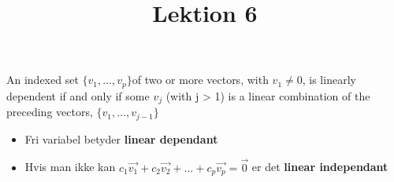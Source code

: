 \documentclass[danish, english]{article}
\title{Lektion 6}
\begin{document}
\maketitle

\begin{theo}[Theorem 4] 
An indexed set $\{v_1, \dots, v_p\} $of two or more vectors, with $v_1 \neq 0$, is linearly dependent if and only if some $v_j$ (with j > 1) is a linear combination of the preceding vectors, $\{v_1, \dots, v_{j-1}\} $
\end{theo}

\begin{theo} 
\begin{itemize}
\item Fri variabel betyder \textbf{linear dependant}
\item Hvis man ikke kan $c_1  \vec{v_1}+c_2\vec{v_2}+\dots+c_p\vec{v_p}=\vec{0}$ er det \textbf{linear independant}
\end{itemize}
\end{theo}
\end{document}
